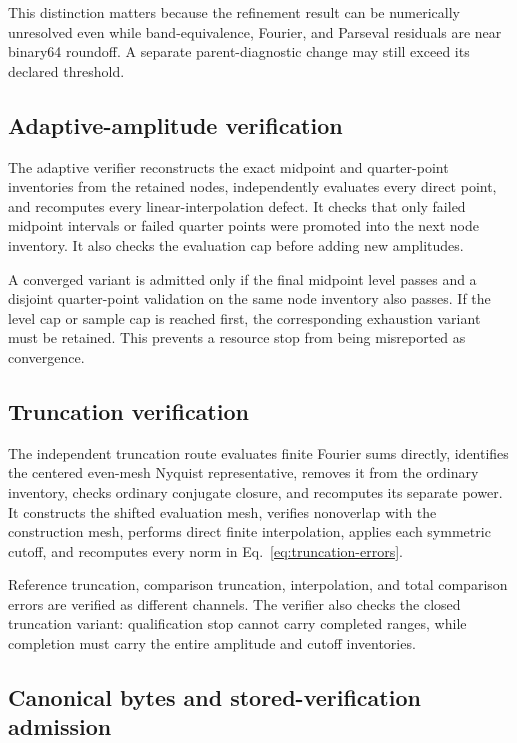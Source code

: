 This distinction matters because the refinement result can be numerically unresolved
even while band-equivalence, Fourier, and Parseval residuals are near binary64 roundoff.
A separate parent-diagnostic change may still exceed its declared threshold.

\subsection{Adaptive-amplitude verification}

The adaptive verifier reconstructs the exact midpoint and quarter-point inventories from
the retained nodes, independently evaluates every direct point, and recomputes every
linear-interpolation defect.  It checks that only failed midpoint intervals or failed
quarter points were promoted into the next node inventory.  It also checks the evaluation
cap before adding new amplitudes.

A converged variant is admitted only if the final midpoint level passes and a disjoint
quarter-point validation on the same node inventory also passes.  If the level cap or
sample cap is reached first, the corresponding exhaustion variant must be retained.
This prevents a resource stop from being misreported as convergence.

\subsection{Truncation verification}

The independent truncation route evaluates finite Fourier sums directly, identifies the
centered even-mesh Nyquist representative, removes it from the ordinary inventory,
checks ordinary conjugate closure, and recomputes its separate power.  It constructs the
shifted evaluation mesh, verifies nonoverlap with the construction mesh, performs direct
finite interpolation, applies each symmetric cutoff, and recomputes every norm in
Eq.~\eqref{eq:truncation-errors}.

Reference truncation, comparison truncation, interpolation, and total comparison errors
are verified as different channels.  The verifier also checks the closed truncation
variant: qualification stop cannot carry completed ranges, while completion must carry
the entire amplitude and cutoff inventories.

\subsection{Canonical bytes and stored-verification admission}

